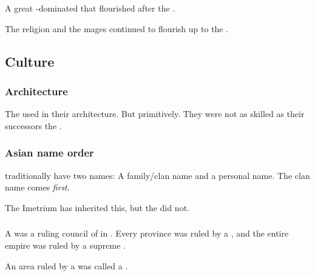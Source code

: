 \chapter{\Ortaica}
\index{\Ortaica}
A great -dominated  that flourished after the . 

The \Ortaican religion and the  mages continued to flourish up to the \thirdbanewar. 









\section{Culture}





\subsection{Architecture}
The \Ortaicans{} used  in their architecture. 
But primitively.
They were not as skilled as their successors the . 





\subsection{Asian name order}
\Ortaican{} traditionally have two names: 
A family/clan name and a personal name. 
The clan name comes \emph{first}. 

The Imetrium has inherited this, but the  did not. 




\subsection{\Baccons}
\index{\bacconate}
\index{\baccon}
A \baccon was a ruling council of \rethyaxes in \Ortaica. 
Every \Ortaican province was ruled by a \baccon, and the entire \Ortaican empire was ruled by a supreme \baccon. 

An area ruled by a \baccon{} was called a \bacconate. 


